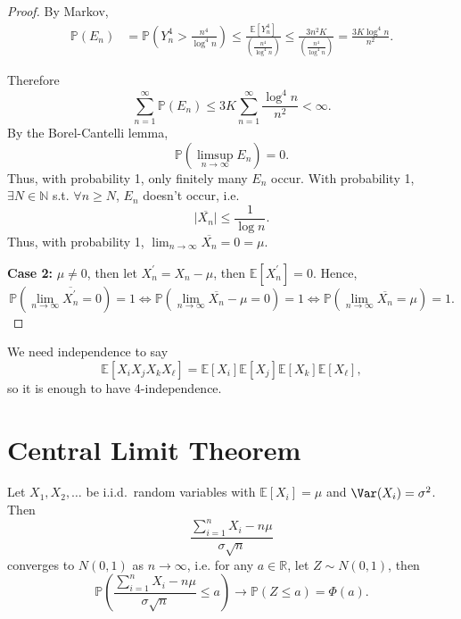 \begin{proof}
    By Markov,
    \begin{align*}
        \mathbb{P}(E_n) &= \mathbb{P} \left( Y_n^4 > \frac{n^4}{\log ^4 n} \right) \le \frac{\mathbb{E} [Y_n^4]}{\left( \frac{n^4}{\log ^4 n} \right) } \le \frac{3 n^2 K}{\left( \frac{n^4}{\log ^4 n} \right) } = \frac{3 K \log ^4 n}{n^2}.
    \end{align*}

    Therefore 
    \[
        \sum_{n=1}^{\infty} \mathbb{P} (E_n) \le 3 K \sum_{n=1}^{\infty} \frac{\log ^4 n}{n^2} < \infty.  
    \]
    By the Borel-Cantelli lemma,
    \[
        \mathbb{P} \left( \limsup_{n \to \infty} E_n  \right) = 0. 
    \]
    Thus, with probability 1, only finitely many \(E_n\) occur. With probability 1, \(\exists N \in \mathbb{N} \) s.t. \(\forall n \ge N\), \(E_n\) doesn't occur, i.e. 
    \[
        \vert \overline{X_n} \vert \le \frac{1}{\log n}. 
    \] 
    Thus, with probability 1, \(\lim_{n \to \infty} \overline{X_n} = 0 = \mu\). 

    \textbf{Case 2:} \(\mu \neq 0\), then let \(X_n^{\prime} = X_n - \mu\), then \(\mathbb{E} [X_n^{\prime} ] = 0\). Hence,
    \[
        \mathbb{P} \left( \lim_{n \to \infty} \overline{X_n^{\prime} } = 0   \right) = 1 \iff \mathbb{P} \left( \lim_{n \to \infty} \overline{X_n} - \mu  = 0\right) = 1 \iff \mathbb{P} \left( \lim_{n \to \infty} \overline{X_n} = \mu   \right) = 1.  
    \]    
\end{proof}

\begin{remark}
    We need independence to say 
    \[
        \mathbb{E} [X_i X_j X_k X_{\ell } ] = \mathbb{E} [X_i] \mathbb{E} [X_j] \mathbb{E} [X_k] \mathbb{E} [X_{\ell } ],
    \]
    so it is enough to have 4-independence.
\end{remark}

\section{Central Limit Theorem}
\begin{theorem}
    Let \(X_1, X_2, \dots \) be i.i.d.\ random variables with \(\mathbb{E} [X_i] = \mu\) and \(\Var(X_i) = \sigma ^2\). Then 
    \[
        \frac{\sum_{i=1}^n X_i - n \mu  }{\sigma \sqrt{n} }
    \]   
    converges to \(N(0, 1)\) as \(n \to \infty\), i.e. for any \(a \in \mathbb{R}\), let \(Z \sim N(0, 1)\), then  
    \[
        \mathbb{P} \left( \frac{\sum_{i=1}^n X_i - n \mu }{\sigma \sqrt{n} } \le a \right) \to \mathbb{P} (Z \le a) = \Phi (a). 
    \]  
\end{theorem}

